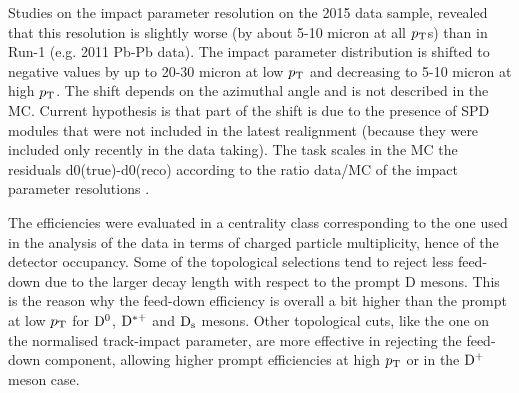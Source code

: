 Studies on the impact parameter resolution on the 2015 data sample, revealed that this resolution is slightly worse (by about 5-10 micron at all $p_{\rm T}$s) than in Run-1 (e.g. 2011 Pb-Pb data).
The impact parameter distribution is shifted to negative values by up to 20-30 micron at low $p_{\rm T}$ and decreasing to 5-10 micron at high $p_{\rm T}$. The shift depends on the azimuthal angle and is not described in the MC. Current hypothesis is that part of the shift is due to the presence of SPD modules that were not included in the latest realignment (because they were included only recently in the data taking). The task scales in the MC the residuals d0(true)-d0(reco) according to the ratio data/MC of the impact parameter resolutions .


The efficiencies were evaluated in a centrality class corresponding to the one used in the analysis of the data in terms of charged particle 
multiplicity, hence of the detector occupancy.
Some of the topological selections tend to reject less feed-down due to the larger 
decay length with respect to the prompt D mesons. This is the reason why the feed-down 
efficiency is overall a bit higher than the prompt at low $p_{\rm T}$ for ${\rm D^0}$, ${\rm D^{*+}}$ and ${\rm D_s}$ mesons.
Other topological cuts, like the one on the normalised track-impact parameter, are more effective
in rejecting the feed-down component, allowing higher prompt efficiencies at high $p_{\rm T}$ or in the ${\rm D^+}$ meson case.

